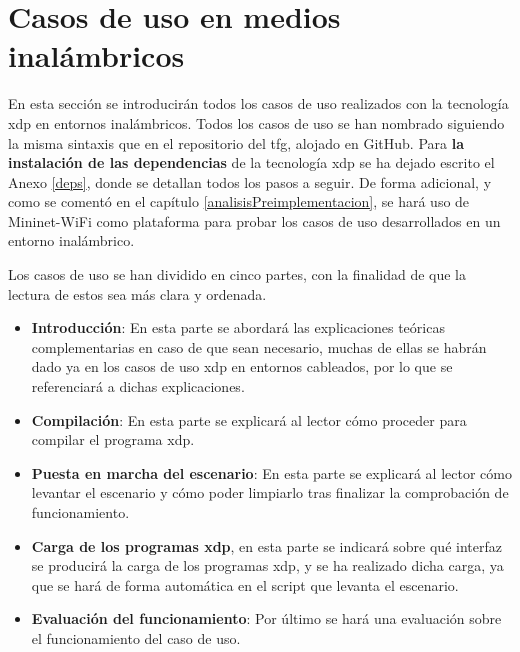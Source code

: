 







\section{Casos de uso  en medios inalámbricos}

En esta sección se introducirán todos los casos de uso realizados con la tecnología \gls{xdp} en entornos inalámbricos. Todos los casos de uso se han nombrado siguiendo la misma sintaxis que en el repositorio del \gls{tfg}, alojado en GitHub. Para \textbf{la instalación de las dependencias} de la tecnología \gls{xdp} se ha dejado escrito el Anexo \ref{deps}, donde se detallan todos los pasos a seguir. De forma adicional, y como se comentó en el capítulo \ref{analisisPreimplementacion}, se hará uso de Mininet-WiFi como plataforma para probar los casos de uso desarrollados en un entorno inalámbrico.\\
\par

Los casos de uso se han dividido en cinco partes, con la finalidad de que la lectura de estos sea más clara y ordenada.

\begin{itemize}
    \item \textbf{Introducción}: En esta parte se abordará las explicaciones teóricas complementarias en caso de que sean necesario, muchas de ellas se habrán dado ya en los casos de uso \gls{xdp} en entornos cableados, por lo que se referenciará a dichas explicaciones.
    
    \item \textbf{Compilación}: En esta parte se explicará al lector cómo proceder para compilar el programa \gls{xdp}.
    
    \item \textbf{Puesta en marcha del escenario}: En esta parte se explicará al lector cómo levantar el escenario y cómo poder limpiarlo tras finalizar la comprobación de funcionamiento.
    \item \textbf{Carga de los programas \gls{xdp}}, en esta parte se indicará sobre qué interfaz se producirá la carga de los programas \gls{xdp}, y se ha realizado dicha carga, ya que se hará de forma automática en el script que levanta el escenario.
    
    \item \textbf{Evaluación del funcionamiento}: Por último se hará una evaluación sobre el funcionamiento del caso de uso.
\end{itemize}

